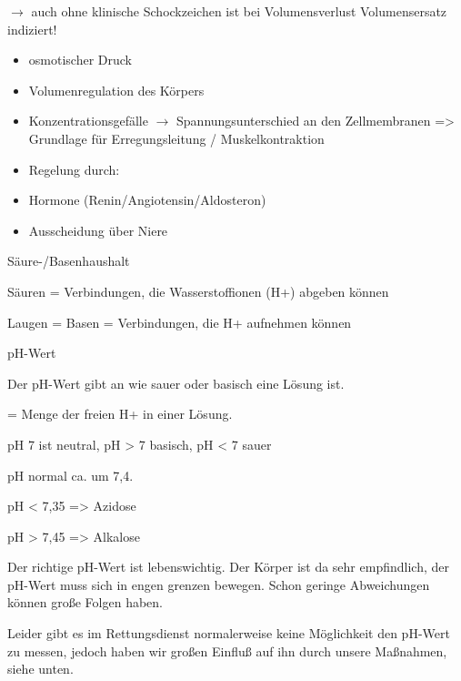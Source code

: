 \documentclass{article}
\begin{document}
${\rightarrow}$ auch ohne klinische Schockzeichen  ist bei
Volumensverlust Volumensersatz  indiziert!

\begin{itemize}
\item osmotischer Druck

\end{itemize}
\begin{itemize}
\item Volumenregulation des K\"orpers

\end{itemize}
\begin{itemize}
\item Konzentrationsgef\"alle ${\rightarrow}$ Spannungsunterschied an
den Zellmembranen ={\textgreater} Grundlage f\"ur Erregungsleitung /
Muskelkontraktion

\item Regelung durch:

\end{itemize}
\begin{itemize}
\item Hormone (Renin/Angiotensin/Aldosteron)

\item Ausscheidung \"uber Niere

\end{itemize}
S\"aure-/Basenhaushalt 

S\"auren = Verbindungen, die  Wasserstoffionen (H+)
abgeben k\"onnen

Laugen = Basen = Verbindungen, die H+ 
aufnehmen k\"onnen

pH-Wert

Der pH-Wert gibt an wie sauer oder basisch eine L\"osung ist.

= Menge der freien H+  in einer L\"osung.

pH 7 ist neutral, pH {\textgreater} 7 basisch, pH {\textless} 7 sauer

pH normal ca. um 7,4.

pH {\textless} 7,35  ={\textgreater} Azidose

pH {\textgreater} 7,45  ={\textgreater} Alkalose

Der richtige pH-Wert ist lebenswichtig. Der K\"orper ist da sehr
empfindlich, der pH-Wert muss sich in engen grenzen bewegen. Schon
geringe Abweichungen k\"onnen gro{\ss}e Folgen haben. 

Leider gibt es im Rettungsdienst normalerweise keine M\"oglichkeit den
pH-Wert zu messen, jedoch haben wir gro{\ss}en Einflu{\ss} auf ihn
durch unsere Ma{\ss}nahmen, siehe unten. 
\end{document}
